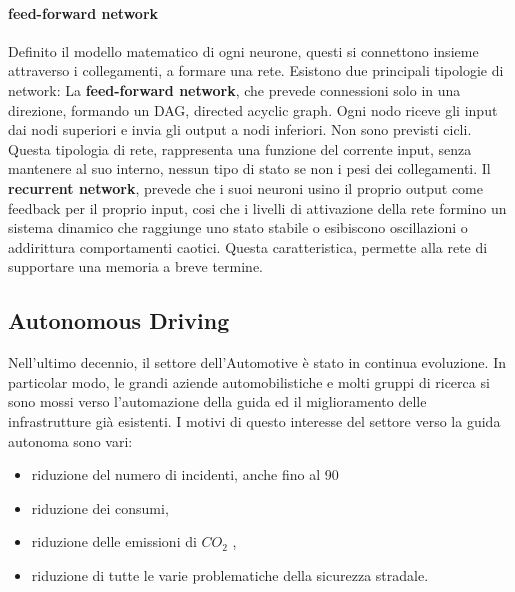 \documentclass[14pt]{extarticle}
\begin{document}
\paragraph{feed-forward network}
Definito il modello matematico di ogni neurone, questi si connettono insieme attraverso i collegamenti, a formare una rete.
Esistono due principali tipologie di network: 
La \textbf{feed-forward network}, che prevede connessioni solo in una direzione, formando un DAG, directed acyclic graph. Ogni nodo riceve gli input dai nodi superiori e invia gli output a nodi inferiori. Non sono previsti cicli. Questa tipologia di rete, rappresenta una funzione del corrente input, senza mantenere al suo interno, nessun tipo di stato se non i pesi dei collegamenti.
Il \textbf{recurrent network}, prevede che i suoi neuroni usino il proprio output come feedback per il proprio input, cosi che i livelli di attivazione della rete formino un sistema dinamico che raggiunge uno stato stabile o
esibiscono oscillazioni o addirittura comportamenti caotici. Questa caratteristica, permette alla rete di supportare una memoria a breve termine.

\subsection{Autonomous Driving}
Nell'ultimo decennio, il settore dell'Automotive è stato in continua evoluzione. In particolar modo, le grandi aziende automobilistiche e molti gruppi di ricerca si sono mossi verso l'automazione della guida ed
il miglioramento delle infrastrutture già esistenti. I motivi di questo
interesse del settore verso la guida autonoma sono vari:
\begin{itemize}
\item riduzione del numero di incidenti, anche fino al 90%
\item  riduzione dei consumi,
\item  riduzione delle emissioni di $CO_{2}$ ,
\item  riduzione di tutte le varie problematiche della sicurezza
stradale.
\end{itemize}
\end{document}
